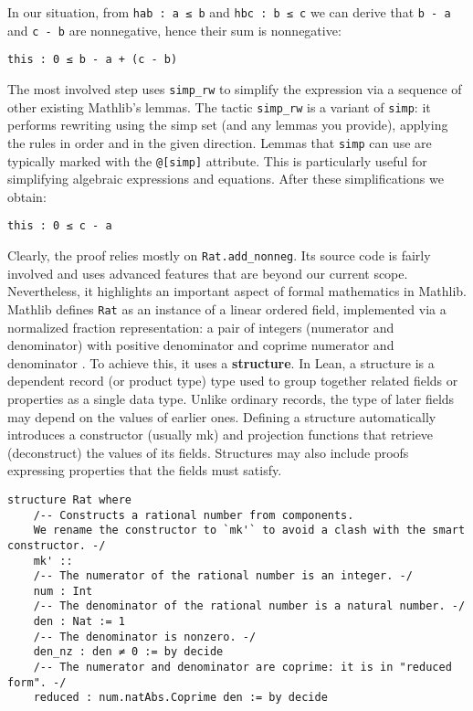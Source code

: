 In our situation, from \lstinline[language=lean]|hab : a ≤ b| and \lstinline[language=lean]|hbc : b ≤ c|
we can derive that \lstinline[language=lean]|b - a| and \lstinline[language=lean]|c - b|
are nonnegative, hence their sum is nonnegative:
\begin{lstlisting}[language=lean]
  this : 0 ≤ b - a + (c - b)
\end{lstlisting}
The most involved step uses \lstinline[language=lean]|simp_rw| to
simplify the expression via a sequence of other existing Mathlib's lemmas.
The tactic \lstinline[language=lean]|simp_rw| is a variant of \lstinline[language=lean]|simp|:
it performs rewriting using the simp set (and any lemmas you provide), applying the rules
in order and in the given direction. Lemmas that \lstinline[language=lean]|simp| can use
are typically marked with the \lstinline[language=lean]|@[simp]| attribute.
This is particularly useful for simplifying algebraic expressions and equations.
After these simplifications we obtain:
\begin{lstlisting}[language=lean]
  this : 0 ≤ c - a
\end{lstlisting}
Clearly, the proof relies mostly on \lstinline[language=lean]|Rat.add_nonneg|.
Its source code is fairly involved and uses advanced features
that are beyond our current scope. Nevertheless, it highlights
an important aspect of formal mathematics in Mathlib.
Mathlib defines \lstinline[language=lean]|Rat| as an instance of
a linear ordered field, implemented via a normalized fraction
representation: a pair of integers (numerator and denominator)
with positive denominator and coprime numerator and denominator \cite{mathlibdoc}.
To achieve this, it uses a \textbf{structure}. In Lean, a structure is a dependent record
(or product type) type  used to group together related fields or properties as a single data type.
Unlike ordinary records, the type of later fields may depend on the values of earlier ones.
Defining a structure automatically introduces a constructor (usually mk) and projection
functions that retrieve (deconstruct) the values of its fields.
Structures may also include proofs expressing properties that the fields must satisfy.
\newpage
\begin{lstlisting}[language=lean]
  structure Rat where
    /-- Constructs a rational number from components.
    We rename the constructor to `mk'` to avoid a clash with the smart constructor. -/
    mk' ::
    /-- The numerator of the rational number is an integer. -/
    num : Int
    /-- The denominator of the rational number is a natural number. -/
    den : Nat := 1
    /-- The denominator is nonzero. -/
    den_nz : den ≠ 0 := by decide
    /-- The numerator and denominator are coprime: it is in "reduced form". -/
    reduced : num.natAbs.Coprime den := by decide
\end{lstlisting}
